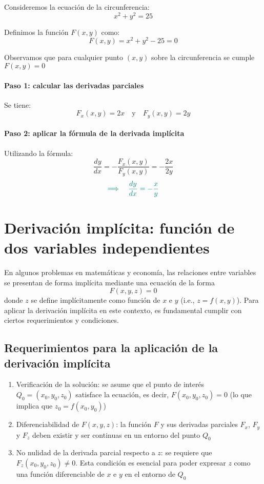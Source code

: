 \documentclass{article}
\begin{document}
Consideremos la ecuación de la circunferencia:
\[
x^2 + y^2 = 25
\]

Definimos la función \( F(x,y) \) como:
\[
F(x,y) = x^2 + y^2 - 25 = 0
\]

Observamos que para cualquier punto \((x,y)\) sobre la circunferencia se cumple \(F(x,y) = 0\)

\paragraph{\color{teal}Paso 1: calcular las derivadas parciales}  
Se tiene:
\[
F_x(x,y) = 2x \quad \text{y} \quad F_y(x,y) = 2y
\]

\paragraph{\color{teal}Paso 2: aplicar la fórmula de la derivada implícita}  
Utilizando la fórmula:
\[
\frac{dy}{dx} = -\frac{F_x(x,y)}{F_y(x,y)} = -\frac{2x}{2y}
\]
\[
\color{teal}
\Longrightarrow \quad \frac{dy}{dx} = -\frac{x}{y}
\]

\section*{Derivación implícita: función de dos variables independientes}

En algunos problemas en matemáticas y economía, las relaciones entre variables se presentan de forma implícita mediante una ecuación de la forma
\[
F(x,y,z) = 0
\]
donde \( z \) se define implícitamente como función de \( x \) e \( y \) (i.e., \( z = f(x,y) \)). Para aplicar la derivación implícita en este contexto, es fundamental cumplir con ciertos requerimientos y condiciones.

\subsection*{Requerimientos para la aplicación de la derivación implícita}
\begin{enumerate}
    \item {\color{teal}Verificación de la solución:} se asume que el punto de interés \( Q_0 = (x_0, y_0, z_0) \) satisface la ecuación, es decir, \( F(x_0, y_0, z_0) = 0 \) (lo que implica que \( z_0 = f(x_0, y_0) \))
    \item {\color{teal}Diferenciabilidad de \( F(x,y,z) \):} la función \( F \) y sus derivadas parciales \( F_x \), \( F_y \) y \( F_z \) deben existir y ser continuas en un entorno del punto \( Q_0 \)
    \item {\color{teal}No nulidad de la derivada parcial respecto a \( z \):} se requiere que \( F_z(x_0, y_0, z_0) \neq 0 \). Esta condición es esencial para poder expresar \( z \) como una función diferenciable de \( x \) e \( y \) en el entorno de \( Q_0 \)
\end{enumerate}
\end{document}
